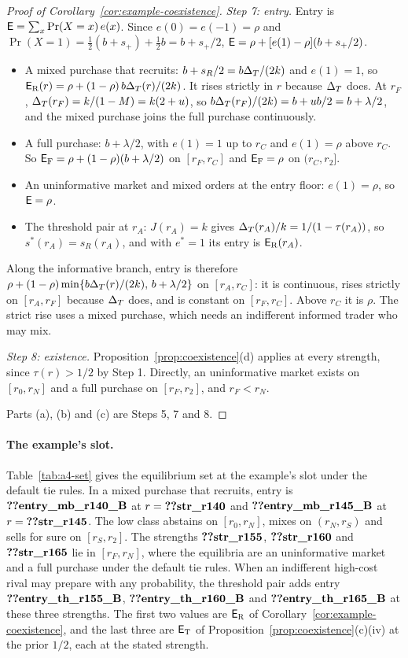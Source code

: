 \begin{proof}[Proof of Corollary~\ref{cor:example-coexistence}]
\emph{Step 7: entry.} Entry is \(\mathsf{E}=\sum_x\Pr(X=x)\,e(x)\). Since \(e(0)=e(-1)=\rho\) and
\(\Pr(X=1)=\tfrac12(b+s_+)+\tfrac12b=b+s_+/2\), \(\mathsf{E}=\rho+[e(1)-\rho](b+s_+/2)\).
\begin{itemize}[leftmargin=2em]
\item A mixed purchase that recruits: \(b+s_R/2=b\Delta_T/(2k)\) and \(e(1)=1\), so
\(\mathsf{E}_{\rm R}(r)=\rho+(1-\rho)\,b\Delta_T(r)/(2k)\). It rises strictly in \(r\) because \(\Delta_T\) does. At \(r_F\),
\(\Delta_T(r_F)=k/(1-M)=k(2+u)\), so \(b\Delta_T(r_F)/(2k)=b+ub/2=b+\lambda/2\), and the mixed purchase joins the full purchase
continuously.
\item A full purchase: \(b+\lambda/2\), with \(e(1)=1\) up to \(r_C\) and \(e(1)=\rho\) above \(r_C\). So
\(\mathsf{E}_{\rm F}=\rho+(1-\rho)(b+\lambda/2)\) on \([r_F,r_C]\) and \(\mathsf{E}_{\rm F}=\rho\) on \((r_C,r_2]\).
\item An uninformative market and mixed orders at the entry floor: \(e(1)=\rho\), so \(\mathsf{E}=\rho\).
\item The threshold pair at \(r_A\): \(J(r_A)=k\) gives \(\Delta_T(r_A)/k=1/(1-\tau(r_A))\), so \(s^*(r_A)=s_R(r_A)\), and with
\(e^*=1\) its entry is \(\mathsf{E}_{\rm R}(r_A)\).
\end{itemize}
Along the informative branch, entry is therefore \(\rho+(1-\rho)\min\{b\Delta_T(r)/(2k),\,b+\lambda/2\}\) on \([r_A,r_C]\): it is
continuous, rises strictly on \([r_A,r_F]\) because \(\Delta_T\) does, and is constant on \([r_F,r_C]\). Above \(r_C\) it is
\(\rho\). The strict rise uses a mixed purchase, which needs an indifferent informed trader who may mix.

\emph{Step 8: existence.} Proposition~\ref{prop:coexistence}(d) applies at every strength, since \(\tau(r)>1/2\) by
Step 1. Directly, an uninformative market exists on \([r_0,r_N]\) and a full purchase on \([r_F,r_2]\), and \(r_F<r_N\).

Parts (a), (b) and (c) are Steps 5, 7 and 8.
\end{proof}

\paragraph{The example's slot.}
Table~\ref{tab:a4-set} gives the equilibrium set at the example's slot under the default tie rules. In a mixed purchase
that recruits, entry is \(\reg{entry_mb_r140_B}\) at \(r=\reg{str_r140}\) and \(\reg{entry_mb_r145_B}\) at
\(r=\reg{str_r145}\). The low class abstains on \([r_0,r_N]\), mixes on \((r_N,r_S)\) and sells for sure on
\([r_S,r_2]\). The strengths \(\reg{str_r155}\), \(\reg{str_r160}\) and \(\reg{str_r165}\) lie in \([r_F,r_N]\), where
the equilibria are an uninformative market and a full purchase under the default tie rules. When an indifferent high-cost
rival may prepare with any probability, the threshold pair adds entry \(\reg{entry_th_r155_B}\),
\(\reg{entry_th_r160_B}\) and \(\reg{entry_th_r165_B}\) at these three strengths. The first two values are
\(\mathsf{E}_{\rm R}\) of Corollary~\ref{cor:example-coexistence}, and the last three are \(\mathsf{E}_{\rm T}\) of
Proposition~\ref{prop:coexistence}(c)(iv) at the prior \(1/2\), each at the stated strength.

